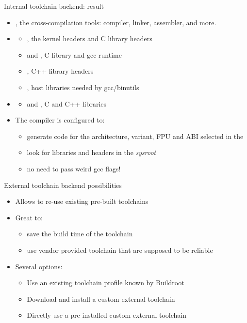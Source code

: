 \begin{frame}{Internal toolchain backend: result}
  \begin{itemize}
  \item {}, the cross-compilation
    tools: compiler, linker, assembler, and more.
  \item {}
    \begin{itemize}
    \item {}, the kernel
      headers and C library headers
    \item {} and , C library and
      gcc runtime
    \item {}, C++ library headers
    \item {}, host libraries needed by gcc/binutils
    \end{itemize}
  \item {}
    \begin{itemize}
    \item {} and , C and C++ libraries
    \end{itemize}
  \item The compiler is configured to:
    \begin{itemize}
    \item generate code for the architecture, variant, FPU and ABI
      selected in the 
    \item look for libraries and headers in the {\em sysroot}
    \item no need to pass weird gcc flags!
    \end{itemize}
  \end{itemize}
\end{frame}

\begin{frame}{External toolchain backend possibilities}
  \begin{itemize}
  \item Allows to re-use existing pre-built toolchains
  \item Great to:
    \begin{itemize}
    \item save the build time of the toolchain
    \item use vendor provided toolchain that are supposed to be
      reliable
    \end{itemize}
  \item Several options:
    \begin{itemize}
    \item Use an existing toolchain profile known by Buildroot
    \item Download and install a custom external toolchain
    \item Directly use a pre-installed custom external toolchain
    \end{itemize}
  \end{itemize}
\end{frame}

